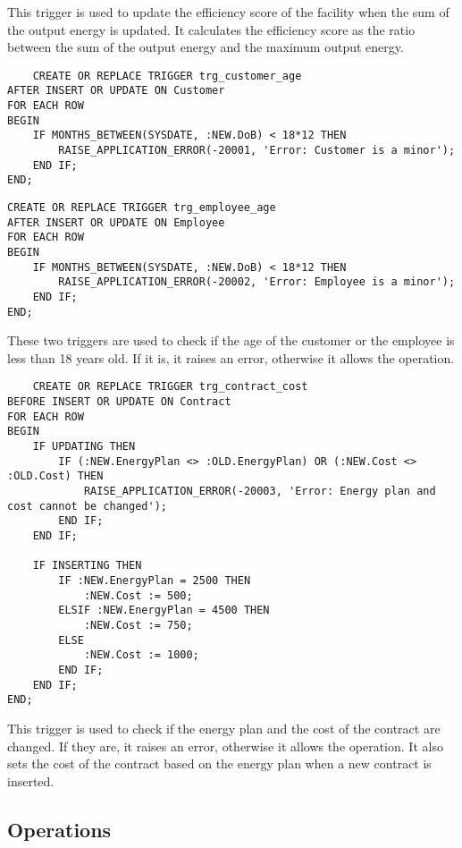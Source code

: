 This trigger is used to update the efficiency score of the facility when the sum of the output energy is updated. It calculates the efficiency score as the ratio between the sum of the output energy and the maximum output energy.

\begin{lstlisting}
    CREATE OR REPLACE TRIGGER trg_customer_age
AFTER INSERT OR UPDATE ON Customer
FOR EACH ROW
BEGIN
    IF MONTHS_BETWEEN(SYSDATE, :NEW.DoB) < 18*12 THEN
        RAISE_APPLICATION_ERROR(-20001, 'Error: Customer is a minor');
    END IF;
END;
\end{lstlisting}

\begin{lstlisting}
CREATE OR REPLACE TRIGGER trg_employee_age
AFTER INSERT OR UPDATE ON Employee
FOR EACH ROW
BEGIN
    IF MONTHS_BETWEEN(SYSDATE, :NEW.DoB) < 18*12 THEN
        RAISE_APPLICATION_ERROR(-20002, 'Error: Employee is a minor');
    END IF;
END;
\end{lstlisting}

These two triggers are used to check if the age of the customer or the employee is less than 18 years old. If it is, it raises an error, otherwise it allows the operation.

\begin{lstlisting}
    CREATE OR REPLACE TRIGGER trg_contract_cost
BEFORE INSERT OR UPDATE ON Contract
FOR EACH ROW
BEGIN
    IF UPDATING THEN
        IF (:NEW.EnergyPlan <> :OLD.EnergyPlan) OR (:NEW.Cost <> :OLD.Cost) THEN
            RAISE_APPLICATION_ERROR(-20003, 'Error: Energy plan and cost cannot be changed');
        END IF;
    END IF;

    IF INSERTING THEN
        IF :NEW.EnergyPlan = 2500 THEN
            :NEW.Cost := 500;
        ELSIF :NEW.EnergyPlan = 4500 THEN
            :NEW.Cost := 750;
        ELSE
            :NEW.Cost := 1000;
        END IF;
    END IF;
END;
\end{lstlisting}

This trigger is used to check if the energy plan and the cost of the contract are changed. If they are, it raises an error, otherwise it allows the operation. It also sets the cost of the contract based on the energy plan when a new contract is inserted.


\subsection{Operations}

